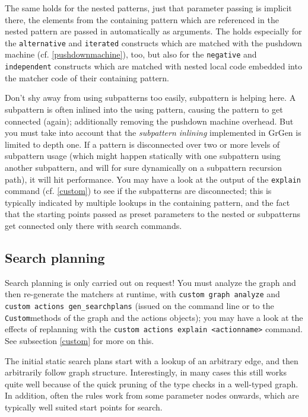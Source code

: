 The same holds for the nested patterns, just that parameter passing is implicit there, the elements from the containing pattern which are referenced in the nested pattern are passed in automatically as arguments.
The holds especially for the \texttt{alternative} and \texttt{iterated} constructs which are matched with the pushdown machine (cf. \ref{pushdownmachine}), too, but also for the \texttt{negative} and \texttt{independent} constructs which are matched with nested local code embedded into the matcher code of their containing pattern.

Don't shy away from using subpatterns too easily, subpattern  is helping here. 
A subpattern is often inlined into the using pattern, causing the pattern to get connected (again); 
additionally removing the pushdown machine overhead.
But you must take into account that the \emph{subpattern inlining} implemented in GrGen is limited to depth one.
If a pattern is disconnected over two or more levels of subpattern usage (which might happen statically with one subpattern using another subpattern, and will for sure dynamically on a subpattern recursion path), it will hit performance.
You may have a look at the output of the \texttt{explain} command (cf. \ref{custom}) to see  if the subpatterns are disconnected; this is typically indicated by multiple lookups in the containing pattern, and the fact that the starting points passed as preset parameters to the nested or subpatterns get connected only there with search commands.

\subsection{Search planning}
Search planning is only carried out on request!
You must analyze the graph and then re-generate the matchers at runtime,
with \texttt{custom graph analyze} and \texttt{custom actions gen\_searchplans} (issued on the command line or to the \texttt{Custom}methods of the graph and the actions objects);
you may have a look at the effects of replanning with the \texttt{custom actions explain <actionname>} command.
See subsection \ref{custom} for more on this.

The initial static search plans start with a lookup of an arbitrary edge, and then arbitrarily follow graph structure.
Interestingly, in many cases this still works quite well because of the quick pruning of the type checks in a well-typed graph.
In addition, often the rules work from some parameter nodes onwards, which are typically well suited start points for search.

